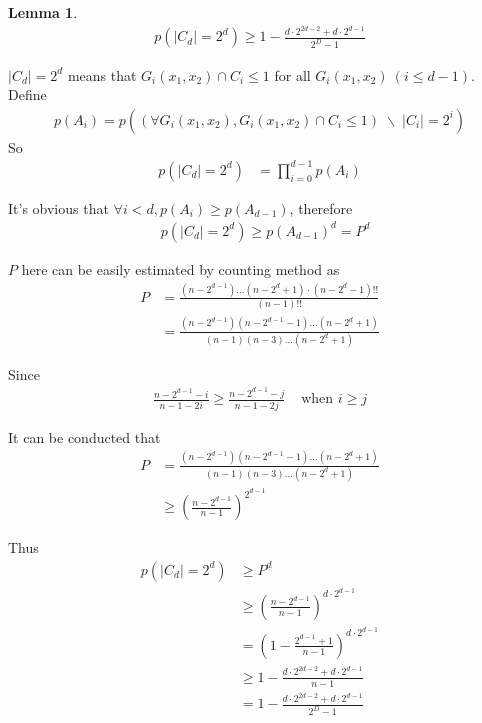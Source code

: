 \documentclass[10pt, conference, compsocconf]{IEEEtran}
\newtheorem{mylemma}{Lemma}
\begin{document}
		\begin{mylemma}
			\begin{align*}
				p(|C_d| = 2^d) \geq 1-\frac{d \cdot 2^{2d-2}+d \cdot 2^{d-1}}{2^D-1}
			\end{align*}
		\end{mylemma}
		
		\begin{IEEEproof}
			$|C_d| = 2^d$ means that $G_i(x_1, x_2) \cap C_i \leq 1$
			for all $G_i(x_1, x_2)~(i \leq d-1)$. Define
			\begin{align*}
				p(A_i) = p\left((\forall G_i(x_1, x_2), G_i(x_1, x_2) \cap C_i \leq 1)
					 \; \backslash \; |C_i| = 2^i\right)
			\end{align*}
			So
			\begin{align*}
				p(|C_d| = 2^d) &= \prod_{i=0}^{d-1} p(A_i)
			\end{align*}
			
			It's obvious that $\forall i < d, p(A_i) \geq p(A_{d-1})$, therefore
			\begin{align*}
				&p(|C_d| = 2^d) 
				\geq p(A_{d-1})^d
				= P^d
			\end{align*}
			
			$P$ here can be easily estimated by counting method as
			\begin{align*}
				P &= \frac{(n-2^{d-1})\ldots(n-2^d+1)\cdot (n-2^d-1)!!}{(n-1)!!}\\
					&= \frac{(n-2^{d-1})(n-2^{d-1}-1)\ldots (n-2^d+1)}{(n-1)(n-3)\ldots(n-2^d+1)}
			\end{align*}
			
			Since
			\begin{align*}
				\frac{n-2^{d-1}-i}{n-1-2i} \geq \frac{n-2^{d-1}-j}{n-1-2j} & \text{ when } i \geq j
			\end{align*}
			
			It can be conducted that
			\begin{align*}
				P &= \frac{(n-2^{d-1})(n-2^{d-1}-1)\ldots (n-2^d+1)}{(n-1)(n-3)\ldots(n-2^d+1)}\\
					&\geq (\frac{n-2^{d-1}}{n-1})^{2^{d-1}}
			\end{align*}
			
			Thus
			\begin{align*}
			p(|C_d| = 2^d) &\geq P^d\\
				&\geq (\frac{n-2^{d-1}}{n-1})^{d \cdot 2^{d-1}}\\
				&= (1-\frac{2^{d-1}+1}{n-1})^{d \cdot 2^{d-1}}\\
				&\geq 1-\frac{d \cdot 2^{2d-2}+d \cdot 2^{d-1}}{n-1}\\
				&= 1-\frac{d \cdot 2^{2d-2}+d \cdot 2^{d-1}}{2^D-1}
			\end{align*}
		\end{IEEEproof}
		
\end{document}
